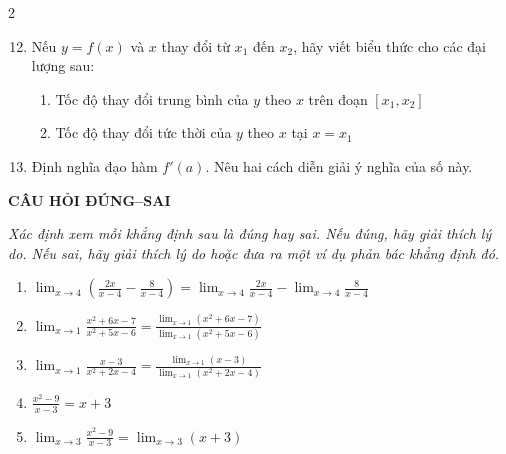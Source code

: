 \begin{multicols}{2}

\begin{enumerate}[label=\textbf{\arabic*.}, leftmargin=1.8em, itemsep=0.8ex, topsep=0pt]
\setcounter{enumi}{11}
  \item Nếu $y = f(x)$ và $x$ thay đổi từ $x_1$ đến $x_2$, hãy viết biểu thức cho các đại lượng sau:
  \begin{enumerate}[label=\textbf{(\alph*)}, leftmargin=1.8em, itemsep=0.3ex, topsep=0.3ex]
    \item Tốc độ thay đổi trung bình của $y$ theo $x$ trên đoạn $[x_1, x_2]$
    \item Tốc độ thay đổi tức thời của $y$ theo $x$ tại $x = x_1$
  \end{enumerate}

  \item Định nghĩa đạo hàm $f'(a)$. Nêu hai cách diễn giải ý nghĩa của số này.
\end{enumerate}

\vspace{1.5em}

{\color{stewartcyan}\sffamily\bfseries\large CÂU HỎI ĐÚNG--SAI}

\vspace{0.6em}

{\small\textit{Xác định xem mỗi khẳng định sau là đúng hay sai. Nếu đúng, hãy giải thích lý do. Nếu sai, hãy giải thích lý do hoặc đưa ra một ví dụ phản bác khẳng định đó.}}

\vspace{0.8em}

\begin{enumerate}[label=\textbf{\arabic*.}, leftmargin=1.8em, itemsep=1.1ex, topsep=0pt]
  \item $\displaystyle \lim_{x\to 4} \left( \frac{2x}{x-4} - \frac{8}{x-4} \right) = \lim_{x\to 4} \frac{2x}{x-4} - \lim_{x\to 4} \frac{8}{x-4}$

  \item $\displaystyle \lim_{x\to 1} \frac{x^2+6x-7}{x^2+5x-6} = \frac{\lim_{x\to 1}(x^2+6x-7)}{\lim_{x\to 1}(x^2+5x-6)}$

  \item $\displaystyle \lim_{x\to 1} \frac{x-3}{x^2+2x-4} = \frac{\lim_{x\to 1}(x-3)}{\lim_{x\to 1}(x^2+2x-4)}$

  \item $\displaystyle \frac{x^2-9}{x-3} = x+3$

  \item $\displaystyle \lim_{x\to 3} \frac{x^2-9}{x-3} = \lim_{x\to 3} (x+3)$


\end{enumerate}
\end{multicols}
